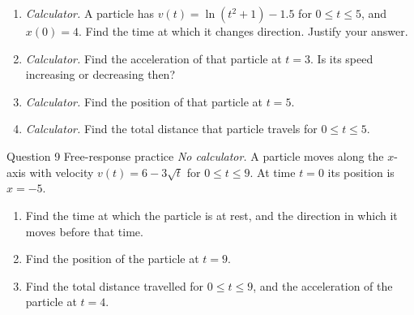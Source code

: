 \documentclass[11pt]{article}
\begin{document}
\begin{enumerate}[leftmargin=*,itemsep=2pt,start=5]
  \item \emph{Calculator.} A particle has $v(t)=\ln\!\left(t^2+1\right)-1.5$ for $0\le t\le5$, and $x(0)=4$. Find the time at which it changes direction. Justify your answer.\work{2.8cm}
  \item \emph{Calculator.} Find the acceleration of that particle at $t=3$. Is its speed increasing or decreasing then?\work{2.8cm}
  \item \emph{Calculator.} Find the position of that particle at $t=5$.\work{2.8cm}
  \item \emph{Calculator.} Find the total distance that particle travels for $0\le t\le5$.\work{2.8cm}
\end{enumerate}

\begin{frbox}{Question 9 \textperiodcentered{} Free-response practice}
\emph{No calculator.} A particle moves along the $x$-axis with velocity $v(t)=6-3\sqrt{t}$ for $0\le t\le9$. At time $t=0$ its position is $x=-5$.
\begin{enumerate}[label=(\alph*),leftmargin=*,itemsep=2pt]
  \item Find the time at which the particle is at rest, and the direction in which it moves before that time.\work{2.6cm}
  \item Find the position of the particle at $t=9$.\work{2.6cm}
  \item Find the total distance travelled for $0\le t\le9$, and the acceleration of the particle at $t=4$.\work{2.6cm}
\end{enumerate}
\end{frbox}
\end{document}
